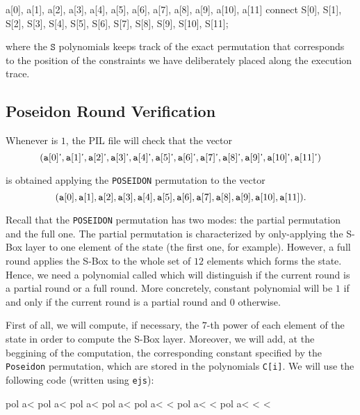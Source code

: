 \begin{pil}
{a[0], a[1], a[2], a[3], a[4], a[5], a[6], a[7], a[8], a[9], a[10], a[11]} connect
    {S[0], S[1], S[2], S[3], S[4], S[5], S[6], S[7], S[8], S[9], S[10], S[11]};
\end{pil}

where the $\texttt{S}$ polynomials keeps track of the exact permutation that corresponds to the position of the constraints we have deliberately placed along the execution trace.

\subsection{Poseidon Round Verification}

Whenever \POSEIDON is $1$, the PIL file will check that the vector 
\[
(\texttt{a}[0] \textsf{'}, \texttt{a}[1] \textsf{'}, \texttt{a}[2] \textsf{'}, \texttt{a}[3] \textsf{'}, \texttt{a}[4] \textsf{'}, \texttt{a}[5] \textsf{'}, \texttt{a}[6] \textsf{'}, \texttt{a}[7] \textsf{'}, \texttt{a}[8] \textsf{'}, \texttt{a}[9] \textsf{'}, \texttt{a}[10] \textsf{'}, \texttt{a}[11] \textsf{'})
\]

is obtained applying the \texttt{POSEIDON} permutation to the vector
\[
(\texttt{a}[0], \texttt{a}[1], \texttt{a}[2], \texttt{a}[3], \texttt{a}[4], \texttt{a}[5], \texttt{a}[6], \texttt{a}[7], \texttt{a}[8], \texttt{a}[9], \texttt{a}[10], \texttt{a}[11]).
\]

Recall that the \texttt{POSEIDON} permutation has two modes: the partial permutation and the full one. The partial permutation is characterized by only-applying the S-Box layer to one element of the state (the first one, for example). However, a full round applies the S-Box to the whole set of $12$ elements which forms the state. Hence, we need a polynomial called \PARTIAL which will distinguish if the current round is a partial round or a full round. More concretely, \PARTIAL constant polynomial will be $1$ if and only if the current round is a partial round and $0$ otherwise. 

First of all, we will compute, if necessary, the $7$-th power of each element of the state in order to compute the S-Box layer. Moreover, we will add, at the beggining of the computation, the corresponding constant specified by the \texttt{Poseidon} permutation, which are stored in the polynomials \texttt{C[i]}. We will use the following code (written using \texttt{ejs}):

\begin{pil}
pol a<%
pol a<%
pol a<%
pol a<%
pol a<%
<%
pol a<%
<%
pol a<%
<%
<%
\end{pil}

